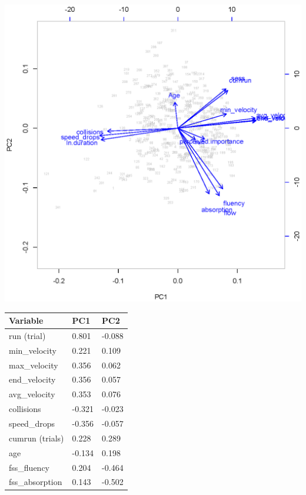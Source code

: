 \documentclass{article}
\begin{document}
\noindent
\begin{minipage}{\textwidth}
\begin{minipage}{.6\textwidth}
\centering
\includegraphics[width=\linewidth]{suppl_pca}
\label{fig:supp_boxes}
\end{minipage}%
\begin{minipage}{.4\textwidth}
\begin{tabular}{lll}
{\bf Variable}   &{\bf PC1}&{\bf PC2}\\
\hline
run (trial)      & 0.801  & -0.088 \\
min\_velocity    & 0.221  & 0.109  \\
max\_velocity    & 0.356  & 0.062  \\
end\_velocity    & 0.356  & 0.057  \\
avg\_velocity    & 0.353  & 0.076  \\
collisions       & -0.321 & -0.023 \\
speed\_drops     & -0.356 & -0.057 \\
cumrun (trials)  & 0.228  & 0.289  \\
age              & -0.134 & 0.198  \\
fss\_fluency     & 0.204  & -0.464 \\
fss\_absorption  & 0.143  & -0.502 \\

\end{tabular}
\end{minipage}
\end{minipage}
\end{document}
